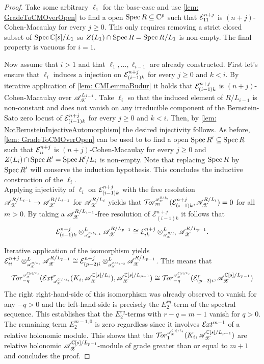 \begin{proof}
  Take some arbitrary $\ell_1$ for the base-case and use \cref{lem: GradeToCMOverOpen} to find a open $\operatorname{Spec} R \subseteq \mathbb{C}^p$ such that $\mathcal{E}^{n+j}_{11}$  is $(n+j)$-Cohen-Macaulay for every $j\geq 0$.
  This only requires removing a strict closed subset of $\operatorname{Spec} \mathbb{C}[s]/L_1$ so $Z(L_1)\cap \operatorname{Spec} R = \operatorname{Spec} R/L_1$ is non-empty.
  The final property is vacuous for $i=1$.

  Now assume that $i>1$ and that $\ell_1,\ldots, \ell_{i-1}$ are already constructed.
  First let's ensure that $\ell_i$
  induces a injection on $\mathcal{E}^{n+j}_{(i-1)k}$ for every $j\geq 0$ and $k<i$.
  By iterative application of \cref{lem: CMLemmaBudur} it holds that $\mathcal{E}^{n+j}_{(i-1)k }$
  is $(n+j)$-Cohen-Macaulay over $\mathscr{A}_{\mathscr{X}}^{L_{i-1}}$.
  Take $\ell_i$ so that the induced element of $R/L_{i-1}$ is non-constant and does not vanish on any irreducible component of the Bernstein-Sato zero locust of $\mathcal{E}^{n+j}_{(i-1)k}$ for every $j\geq 0$ and $k<i$.
  Then, by \cref{lem: NotBernsteinInjectiveAutomorphism} the desired injectivity follows.
  As before, \cref{lem: GradeToCMOverOpen} can be used to to find a open $\operatorname{Spec} R' \subseteq \operatorname{Spec} R$ such that $\mathcal{E}^{n+j}_{ii}$  is $(n+j)$-Cohen-Macaulay for every $j\geq 0$ and  $Z(L_i)\cap \operatorname{Spec} R' = \operatorname{Spec} R'/L_i$ is non-empty.
  Note that replacing $\operatorname{Spec} R$ by $\operatorname{Spec} R'$ will conserve the induction hypothesis.
  This concludes the inductive construction of the $\ell_i$.\\


  Applying injectivity of $\ell_i$ on $\mathcal{E}_{(i-1)k}^{n+j}$ with the free resolution $\mathscr{A}_{\mathscr{X}}^{R/L_{i-1}}\to\mathscr{A}_{\mathscr{X}}^{R/L_{i-1}}$ for $\mathscr{A}_{\mathscr{X}}^{R/L_i}$ yields that $\Tr{\A_\X^{R/L_i}}{m}(\E_{(i-1)k}^{n+j}, \A_\X^{R/L_i}) = 0$ for all $m>0$.
  By taking a $\mathscr{A}_{\mathscr{X}}^{R/L_{i-1}}$-free resolution of $\mathcal{E}_{(i-1)k}^{n+j}$ it follows that
  $$\mathcal{E}_{(i-1)k}^{n+j} \otimes^L_{\scaleto{\A_\X^{R/L_{i-1}}}{8pt}} \A_\X^{R/L_{p-1}} \cong  \mathcal{E}_{ik}^{n+j}  \otimes^L_{\scaleto{\A_\X^{R/L_{i}}}{8pt}}\A_\X^{R/L_{p-1}}. $$


  Iterative application of the isomorphism yields $\E_{ii}^{n+j}\otimes^L_{\scaleto{\A_\X^{R/L_{i}}}{8pt}} \A_\X^{R/L_{p-1}} \cong \E_{(p-2)i}^{n+j}\otimes^L_{\scaleto{\A_\X^{R/L_{p-2}}}{8pt}} \A_\X^{R/L_{p-1}}$.
  This means that
  $$\Tr{\A_\X^{\C[s]/L_{i}}}{-q} (\Ex{\A_\X^{\C[s]/L_{i}} }{r} (K_i,\A_\X^{\C[s]/L_{i}}), \A_\X^{\C[s]/L_{p-1}})\cong \Tr{\A_\X^{\C[s]/L_{i}} }{-q}(\E_{(p-2)i}^{r}, \A_\X^{\C[s]/L_{p-1}}) $$
  The right right-hand-side of this isomorphism was already observed to vanish for any $-q > 0$ and the left-hand-side is precisely the $E^{rq}_2$-term of the spectral sequence.
  This establishes that the $E^{rq}_2$-terms with $r-q = m -1$ vanish for $q>0$.
  The remaining term $E^{m -1,0}_2$ is zero regardless since it involves $\mathcal{E}\mkern -1mu xt^{m - 1}$ of a relative holonomic module.
  This shows that the $\Tr{\A_\X^{\C[s]/L_i}}{1}(K_i, \A_\X^{\C[s]/L_{p-1}})$ are relative holonomic $\mathscr{A}_{\mathscr{X}}^{\mathbb{C}[s]/L_{p-1}}$-module of grade greater than or equal to $m+1$ and concludes the proof.
  \end{proof}



